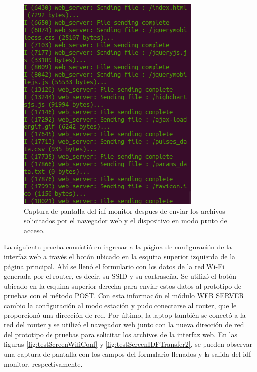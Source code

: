 \begin{figure}[ht]
	\centering
	\includegraphics[scale=0.53]{./Figures/test_interface_idf_downloads.png}
	\caption{Captura de pantalla del idf-monitor después de enviar los archivos solicitados por el navegador web y el dispositivo en modo punto de acceso.}
	\label{fig:testScreenIDFTransfer}
\end{figure}

La siguiente prueba consistió en ingresar a la página de configuración de la interfaz web a través el botón ubicado en la esquina superior izquierda de la página principal. Ahí se llenó el formulario con los datos de la red Wi-Fi generada por el router, es decir, su SSID y su contraseña. Se utilizó el botón ubicado en la esquina superior derecha para enviar estos datos al prototipo de pruebas con el método POST. Con esta información el módulo WEB SERVER cambio la configuración al modo estación y pudo conectarse al router, que le proporcionó una dirección de red. Por último, la laptop también se conectó a la red del router y se utilizó el navegador web junto con la nueva dirección de red del prototipo de pruebas para solicitar los archivos de la interfaz web. En las figuras \ref{fig:testScreenWifiConf} y \ref{fig:testScreenIDFTransfer2}, se pueden observar una captura de pantalla con los campos del formulario llenados y la salida del idf-monitor, respectivamente.

